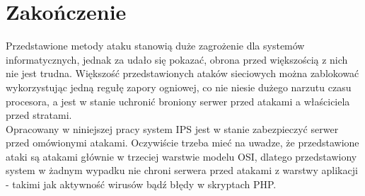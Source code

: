 \chapter*{Zakończenie}
	Przedstawione metody ataku stanowią duże zagrożenie dla systemów informatycznych, jednak za udało się pokazać, obrona przed większością z nich nie jest trudna.
	Większość przedstawionych ataków sieciowych można zablokować wykorzystując jedną regułę zapory ogniowej, co nie niesie dużego narzutu czasu procesora, a jest w stanie uchronić broniony serwer przed atakami a właściciela przed stratami.\\
	Opracowany w niniejszej pracy system IPS jest w stanie zabezpieczyć serwer przed omówionymi atakami.
	Oczywiście trzeba mieć na uwadze, że przedstawione ataki są atakami głównie w trzeciej warstwie modelu OSI, dlatego przedstawiony system w żadnym wypadku nie chroni serwera przed atakami z warstwy aplikacji - takimi jak aktywność wirusów bądź błędy w skryptach PHP.
